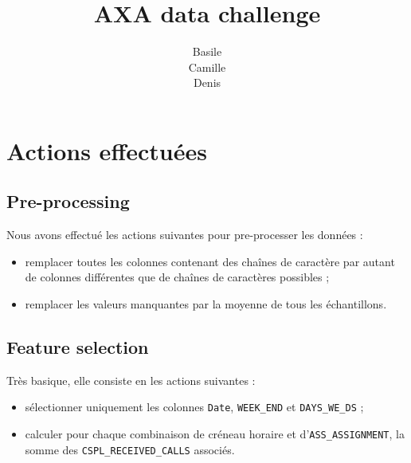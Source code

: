 \documentclass[a4paper,11pt,french]{article}
\title{AXA data challenge}
\author{Basile \bsc{Bruneau}\\Camille \bsc{Masset}\\Denis \bsc{Merigoux}}
\begin{document}
    \maketitle

    \section{Actions effectuées}

    \subsection{Pre-processing}

        Nous avons effectué les actions suivantes pour pre-processer les données :
        \begin{itemize}
            \item remplacer toutes les colonnes contenant des chaînes de caractère par autant de colonnes différentes que de chaînes de caractères possibles ;
            \item remplacer les valeurs manquantes par la moyenne de tous les échantillons.
        \end{itemize}

    \subsection{Feature selection}
        Très basique, elle consiste en les actions suivantes :
        \begin{itemize}
            \item sélectionner uniquement les colonnes \verb|Date|, \verb|WEEK_END| et \verb|DAYS_WE_DS| ;
            \item calculer pour chaque combinaison de créneau horaire et d'\verb|ASS_ASSIGNMENT|, la somme des \verb|CSPL_RECEIVED_CALLS| associés.
        \end{itemize}
\end{document}
